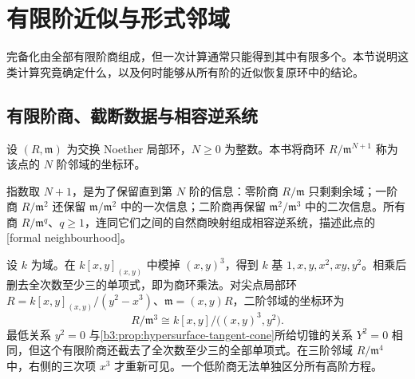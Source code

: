 
\section{有限阶近似与形式邻域}
\label{b3:sec:1305}


完备化由全部有限阶商组成，但一次计算通常只能得到其中有限多个。本节说明这类计算究竟确定什么，以及何时能够从所有阶的近似恢复原环中的结论。

\subsection{有限阶商、截断数据与相容逆系统}
\label{b3:subsec:1305:01}

\begin{definition}\label{b3:def:finite-order-neighbourhood}
	设 \((R,\mathfrak m)\) 为交换 Noether 局部环，\(N\ge0\) 为整数。本书将商环 \(R/\mathfrak m^{N+1}\) 称为该点的 \(N\) 阶邻域的坐标环。
\end{definition}

指数取 \(N+1\)，是为了保留直到第 \(N\) 阶的信息：零阶商 \(R/\mathfrak m\) 只剩剩余域；一阶商 \(R/\mathfrak m^2\) 还保留 \(\mathfrak m/\mathfrak m^2\) 中的一次信息；二阶商再保留 \(\mathfrak m^2/\mathfrak m^3\) 中的二次信息。所有商 \(R/\mathfrak m^q\)、\(q\ge1\)，连同它们之间的自然商映射组成相容逆系统，描述此点的[formal neighbourhood]。

\ProseParagraphBreak
设 \(k\) 为域。在 \(k[x,y]_{(x,y)}\) 中模掉 \((x,y)^3\)，得到 \(k\) 基 \(1,x,y,x^2,xy,y^2\)。相乘后删去全次数至少三的单项式，即为商环乘法。对尖点局部环 \(R=k[x,y]_{(x,y)}/(y^2-x^3)\)、\(\mathfrak m=(x,y)R\)，二阶邻域的坐标环为
\[
	R/\mathfrak m^3\cong k[x,y]/\bigl((x,y)^3,y^2\bigr).
\]
最低关系 \(y^2=0\) 与\cref{b3:prop:hypersurface-tangent-cone}所给切锥的关系 \(Y^2=0\) 相同，但这个有限阶商还截去了全次数至少三的全部单项式。在三阶邻域 \(R/\mathfrak m^4\) 中，右侧的三次项 \(x^3\) 才重新可见。一个低阶商无法单独区分所有高阶方程。

